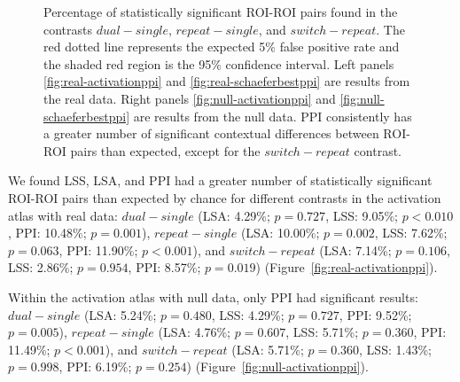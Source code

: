 \documentclass[phd,appendix,figures]{uithesis}
\begin{document}
\begin{figure}[H]
  \centering
  \hfill
  \vfill
  \hfill
  \caption[Comparison of LSA/LSS/PPI using participant data]{
    Percentage of statistically significant ROI-ROI pairs found
    in the contrasts $dual - single$, $repeat - single$, and
    $switch - repeat$.
    The red dotted line represents the expected 5\% false positive rate
    and the shaded red region is the 95\% confidence interval.
    Left panels \ref{fig:real-activationppi} and \ref{fig:real-schaeferbestppi}
    are results from the real data.
    Right panels \ref{fig:null-activationppi} and \ref{fig:null-schaeferbestppi} are results
    from the null data.
    PPI consistently has a greater number of significant contextual differences between ROI-ROI pairs
    than expected, except for the $switch - repeat$ contrast.
  }
\label{fig:main-resultppi}
\end{figure}

We found LSS, LSA, and PPI had a greater number of statistically significant ROI-ROI pairs than expected by chance
for different contrasts in the activation atlas with real data: $dual - single$ (LSA: 4.29\%; $p = 0.727$,
LSS: 9.05\%; $p < 0.010$, PPI: 10.48\%; $p = 0.001$),
$repeat - single$ (LSA: 10.00\%; $p = 0.002$, LSS: 7.62\%; $p = 0.063$, PPI: 11.90\%; $p < 0.001$), and
$switch - repeat$ (LSA: 7.14\%; $p = 0.106$, LSS: 2.86\%; $p = 0.954$, PPI: 8.57\%; $p = 0.019$) (Figure~\ref{fig:real-activationppi}).

Within the activation atlas with null data, only PPI had significant results:
$dual - single$ (LSA: 5.24\%; $p = 0.480$, LSS: 4.29\%; $p = 0.727$, PPI: 9.52\%; $p = 0.005$),
$repeat - single$ (LSA: 4.76\%; $p = 0.607$, LSS: 5.71\%; $p = 0.360$, PPI: 11.49\%; $p < 0.001$), and
$switch - repeat$ (LSA: 5.71\%; $p = 0.360$, LSS: 1.43\%; $p = 0.998$, PPI: 6.19\%; $p = 0.254$) (Figure~\ref{fig:null-activationppi}).
\end{document}
